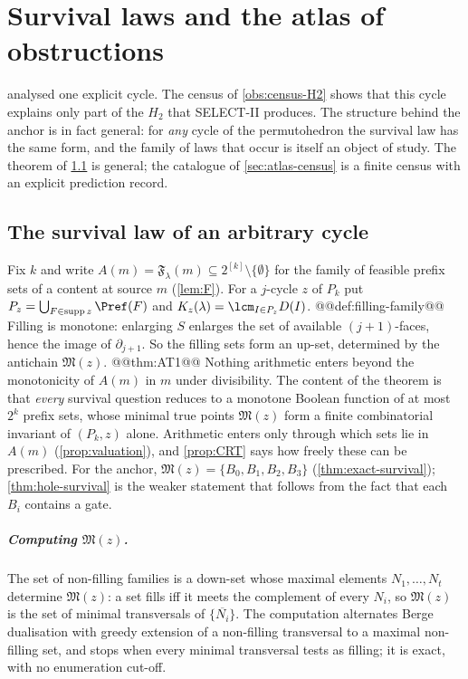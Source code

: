 \chapter{Survival laws and the atlas of obstructions}\label{ch:atlas}

 analysed one explicit cycle. The census of \cref{obs:census-H2} shows that this cycle explains only part of the $H_2$ that SELECT-II produces. The structure behind the anchor is in fact general: for \emph{any} cycle of the permutohedron the survival law has the same form, and the family of laws that occur is itself an object of study. The theorem of \cref{sec:atlas-law} is general; the catalogue of \cref{sec:atlas-census} is a finite census with an explicit prediction record.

\section{The survival law of an arbitrary cycle}\label{sec:atlas-law}
Fix $k$ and write $A(m)=\mathfrak F_\lambda(m)\subseteq 2^{[k]}\setminus\{\emptyset\}$ for the family of feasible prefix sets of a content at source $m$ (\cref{lem:F}). For a $j$-cycle $z$ of $P_k$ put $P_z=\bigcup_{F\in\operatorname{supp}z}\Pref(F)$ and $K_z(\lambda)=\lcm_{I\in P_z}D(I)$.
@@def:filling-family@@
Filling is monotone: enlarging $S$ enlarges the set of available $(j{+}1)$-faces, hence the image of $\partial_{j+1}$. So the filling sets form an up-set, determined by the antichain $\mathfrak M(z)$.
@@thm:AT1@@
Nothing arithmetic enters beyond the monotonicity of $A(m)$ in $m$ under divisibility. The content of the theorem is that \emph{every} survival question reduces to a monotone Boolean function of at most $2^k$ prefix sets, whose minimal true points $\mathfrak M(z)$ form a finite combinatorial invariant of $(P_k,z)$ alone. Arithmetic enters only through which sets lie in $A(m)$ (\cref{prop:valuation}), and \cref{prop:CRT} says how freely these can be prescribed. For the anchor, $\mathfrak M(z)=\{B_0,B_1,B_2,B_3\}$ (\cref{thm:exact-survival}); \cref{thm:hole-survival} is the weaker statement that follows from the fact that each $B_i$ contains a gate.

\paragraph{Computing $\mathfrak M(z)$.} The set of non-filling families is a down-set whose maximal elements $N_1,\dots,N_t$ determine $\mathfrak M(z)$: a set fills iff it meets the complement of every $N_i$, so $\mathfrak M(z)$ is the set of minimal transversals of $\{\overline{N_i}\}$. The computation alternates Berge dualisation with greedy extension of a non-filling transversal to a maximal non-filling set, and stops when every minimal transversal tests as filling; it is exact, with no enumeration cut-off.

